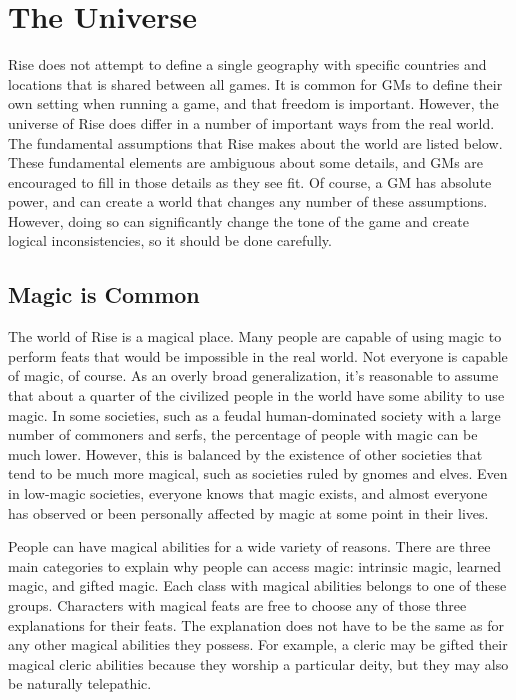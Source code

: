 \chapter{The Universe}

Rise does not attempt to define a single geography with specific countries and locations that is shared between all games.
It is common for GMs to define their own setting when running a game, and that freedom is important.
However, the universe of Rise does differ in a number of important ways from the real world.
The fundamental assumptions that Rise makes about the world are listed below.
These fundamental elements are ambiguous about some details, and GMs are encouraged to fill in those details as they see fit.
Of course, a GM has absolute power, and can create a world that changes any number of these assumptions.
However, doing so can significantly change the tone of the game and create logical inconsistencies, so it should be done carefully.

\section{Magic is Common}
  The world of Rise is a magical place.
  Many people are capable of using magic to perform feats that would be impossible in the real world.
  Not everyone is capable of magic, of course.
  As an overly broad generalization, it's reasonable to assume that about a quarter of the civilized people in the world have some ability to use magic.
  In some societies, such as a feudal human-dominated society with a large number of commoners and serfs, the percentage of people with magic can be much lower.
  However, this is balanced by the existence of other societies that tend to be much more magical, such as societies ruled by gnomes and elves.
  Even in low-magic societies, everyone knows that magic exists, and almost everyone has observed or been personally affected by magic at some point in their lives.

  People can have magical abilities for a wide variety of reasons.
  There are three main categories to explain why people can access magic: intrinsic magic, learned magic, and gifted magic.
  Each class with magical abilities belongs to one of these groups.
  Characters with magical feats are free to choose any of those three explanations for their feats.
  The explanation does not have to be the same as for any other magical abilities they possess.
  For example, a cleric may be gifted their magical cleric abilities because they worship a particular deity, but they may also be naturally telepathic.


